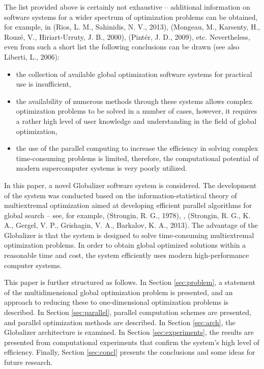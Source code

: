 \documentclass{gOMS2e}
\theoremstyle{plain}%
\theoremstyle{definition}
\theoremstyle{remark}
\begin{document}
\par
The list provided above is certainly not exhaustive – additional information on software
systems for a wider spectrum of optimization problems can be obtained, for example,
in (Rios, L. M., Sahinidis, N. V., 2013), (Mongeau, M.,  Karsenty, H., Rouzé, V., Hiriart-Urruty, J. B., 2000), (Pintér, J. D., 2009), etc.
Nevertheless, even from such a short list the following conclusions can be drawn (see also Liberti, L., 2006):
\begin{itemize}
\item  the collection of available global optimization software systems for practical use is insufficient,
\item the availability of numerous methods through these systems allows complex
optimization problems to be solved in a number of cases, however, it requires a rather
high level of user knowledge and understanding in the field of global optimization,
\item the use of the parallel computing to increase the efficiency in solving complex
time-consuming problems is limited, therefore, the computational potential of modern
supercomputer systems is very poorly utilized.
\end{itemize}
\par
In this paper, a novel Globalizer software system is considered. The development of the
system was conducted based on the information-statistical theory of multiextremal
optimization aimed at developing efficient parallel algorithms for global search – see, for example, (Strongin, R. G., 1978), \cite{strSergGO}, (Strongin, R. G., K. A., Gergel, V. P., Grishagin, V. A., Barkalov, K. A., 2013).
The advantage of the Globalizer is that the system is designed to solve time-consuming
multiextremal optimization problems. In order to obtain global optimized solutions
within a reasonable time and cost, the system efficiently uses modern high-performance computer systems.
\par
This paper is further structured as follows. In Section \ref{sec:problem}, a statement of the multidimensional
global optimization problem is presented, and an approach to reducing these to one-dimensional
optimization problems is described. In Section \ref{sec:parallel}, parallel computation schemes are presented,
and parallel optimization methods are described. In Section \ref{sec:arch}, the Globalizer architecture
is examined. In Section \ref{sec:experiments}, the results are presented from computational experiments
that confirm the system’s high level of efficiency. Finally, Section \ref{sec:concl} presents the
conclusions and some ideas for future research.
\end{document}
